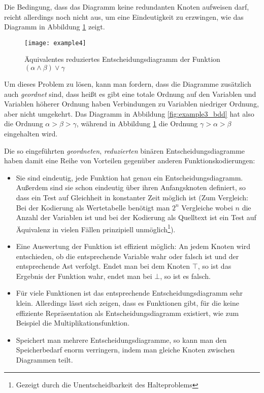 Die Bedingung, dass das Diagramm keine redundanten Knoten aufweisen darf, reicht allerdings noch nicht aus, um eine Eindeutigkeit zu erzwingen, wie das Diagramm in Abbildung \ref{fig:example4_bdd} zeigt.
\begin{figure}[h]
  \centering
  \texttt{[image: example4]}
  \caption{Äquivalentes reduziertes Entscheidungsdiagramm der Funktion $(\alpha\land\beta)\lor \gamma$}
  \label{fig:example4_bdd}
\end{figure}

Um dieses Problem zu lösen, kann man fordern, dass die Diagramme zusätzlich auch \emph{geordnet} sind, dass heißt es gibt eine totale Ordnung auf den Variablen und Variablen höherer Ordnung haben Verbindungen zu Variablen niedriger Ordnung, aber nicht umgekehrt.
Das Diagramm in Abbildung \ref{fig:example3_bdd} hat also die Ordnung $\alpha > \beta > \gamma$, während in Abbildung \ref{fig:example4_bdd} die Ordnung $\gamma > \alpha > \beta$ eingehalten wird.

Die so eingeführten \emph{geordneten}, \emph{reduzierten} binären Entscheidungsdiagramme haben damit eine Reihe von Vorteilen gegenüber anderen Funktionskodierungen:
\begin{itemize}
\item Sie sind eindeutig, jede Funktion hat genau ein Entscheidungsdiagramm.
  Außerdem sind sie schon eindeutig über ihren Anfangsknoten definiert, so dass ein Test auf Gleichheit in konstanter Zeit möglich ist (Zum Vergleich: Bei der Kodierung als Wertetabelle benötigt man $2^n$ Vergleiche wobei $n$ die Anzahl der Variablen ist und bei der Kodierung als Quelltext ist ein Test auf Äquivalenz in vielen Fällen prinzipiell unmöglich\footnote{Gezeigt durch die Unentscheidbarkeit des Halteproblems\cite{halteproblem}}).
\item Eine Auswertung der Funktion ist effizient möglich:
  An jedem Knoten wird entschieden, ob die entsprechende Variable wahr oder falsch ist und der entsprechende Ast verfolgt.
  Endet man bei dem Knoten $\top$, so ist das Ergebnis der Funktion wahr, endet man bei $\bot$, so ist es falsch.
\item Für viele Funktionen ist das entsprechende Entscheidungsdiagramm sehr klein.
  Allerdings lässt sich zeigen, dass es Funktionen gibt, für die keine effiziente Repräsentation als Entscheidungsdiagramm existiert, wie zum Beispiel die Multiplikationsfunktion\cite{Bryant98onthe}.
\item Speichert man mehrere Entscheidungsdiagramme, so kann man den Speicherbedarf enorm verringern, indem man gleiche Knoten zwischen Diagrammen teilt.
\end{itemize}

